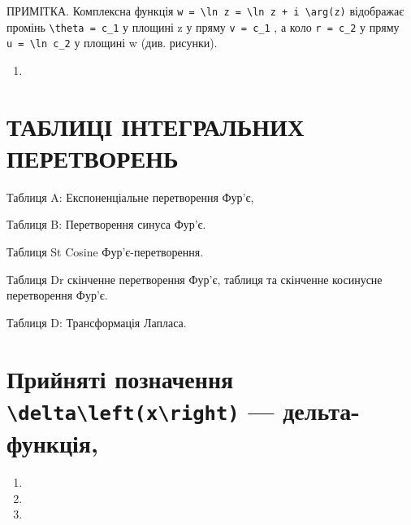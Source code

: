 \documentclass[
  ukrainian,
]{article}
\providecommand{\tightlist}{%
  \setlength{\itemsep}{0pt}\setlength{\parskip}{0pt}}
\begin{document}
ПРИМІТКА. Комплексна функція
\texttt{w\ =\ \textbackslash{}ln\ z\ =\ \textbackslash{}ln\ \textbar{}z\textbar{}\ +\ i\ \textbackslash{}arg(z)}
відображає промінь \texttt{\textbackslash{}theta\ =\ c\_1} у площині z у
пряму \texttt{v\ =\ c\_1} , а коло \texttt{r\ =\ c\_2} у пряму
\texttt{u\ =\ \textbackslash{}ln\ c\_2} у площині w (див. рисунки).

\begin{enumerate}
\def\labelenumi{\arabic{enumi}.}
\setcounter{enumi}{10}
\tightlist
\item
\end{enumerate}

\section{ТАБЛИЦІ ІНТЕГРАЛЬНИХ
ПЕРЕТВОРЕНЬ}\label{ux442ux430ux431ux43bux438ux446ux456-ux456ux43dux442ux435ux433ux440ux430ux43bux44cux43dux438ux445-ux43fux435ux440ux435ux442ux432ux43eux440ux435ux43dux44c}

Таблиця A: Експоненціальне перетворення Фур'є,

Таблиця B: Перетворення синуса Фур'є.

Таблиця St Cosine Фур'є-перетворення.

Таблиця Dr скінченне перетворення Фур'є, таблиця та скінченне косинусне
перетворення Фур'є.

Таблиця D: Трансформація Лапласа.

\section{\texorpdfstring{Прийняті позначення
\texttt{\textbackslash{}delta\textbackslash{}left(x\textbackslash{}right)}
---
дельта-функція,}{Прийняті позначення \textbackslash delta\textbackslash left(x\textbackslash right) --- дельта-функція,}}\label{ux43fux440ux438ux439ux43dux44fux442ux456-ux43fux43eux437ux43dux430ux447ux435ux43dux43dux44f-deltaleftxright-ux434ux435ux43bux44cux442ux430-ux444ux443ux43dux43aux446ux456ux44f}

\begin{enumerate}
\def\labelenumi{\arabic{enumi}.}
\setcounter{enumi}{11}
\tightlist
\item
\item
\item
\end{enumerate}
\end{document}
